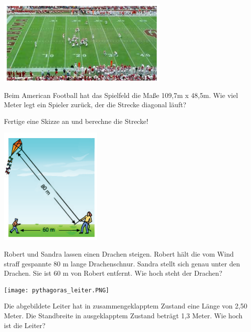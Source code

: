 \begin{minipage}{0.4 \textwidth}
    \includegraphics[scale=0.7]{bilder/spielfeld_american_football.png}
\end{minipage}%
\begin{minipage}{0.55 \textwidth}
    Beim American Football hat das Spielfeld die Maße 109,7m x 48,5m. Wie viel Meter legt ein Spieler zurück, der die Strecke diagonal läuft? 
    
    Fertige eine Skizze an und berechne die Strecke!
\end{minipage}

\droptotalpoints

\question[4]

\begin{minipage}{0.4 \textwidth}
  \includegraphics[scale=1]{bilder/pythagoras_drachen.PNG}
\end{minipage}%
\begin{minipage}{0.55 \textwidth}
  Robert und Sandra lassen einen Drachen steigen. Robert hält die vom
  Wind straff gespannte 80 m lange Drachenschnur. Sandra stellt sich
  genau unter den Drachen. Sie ist 60 m von Robert entfernt. Wie hoch
  steht der Drachen? 
\end{minipage}

\droptotalpoints

\newpage
\question[4]
\begin{minipage}{0.4\textwidth}
    \texttt{[image: pythagoras\_leiter.PNG]}
\end{minipage}%
\begin{minipage}[b]{0.5\textwidth}
    Die abgebildete Leiter hat in zusammengeklapptem Zustand eine Länge von 2,50 Meter. Die Standbreite in ausgeklapptem Zustand beträgt 1,3 Meter. Wie hoch ist die Leiter?
\end{minipage}

